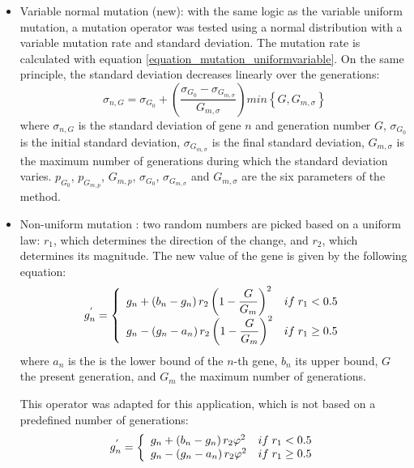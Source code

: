 \documentclass[twocol]{ametsoc}
\begin{document}
\begin{itemize}
	\item Variable normal mutation (new): with the same logic as the variable uniform mutation, a mutation operator was tested using a normal distribution with a variable mutation rate and standard deviation. The mutation rate is calculated with equation \ref{equation_mutation_uniformvariable}. On the same principle, the standard deviation decreases linearly over the generations:
	\begin{equation}
	\sigma_{n,G} = \sigma_{G_{0}}+\left( \dfrac{\sigma_{G_{0}}-\sigma_{G_{m,\sigma}}}{G_{m,\sigma}} \right) min\left\lbrace G,G_{m,\sigma}\right\rbrace 
	\label{equation_mutation_normalvariable}
	\end{equation}
	where $\sigma_{n,G}$ is the standard deviation of gene $n$ and generation number $G$, $\sigma_{G_{0}}$ is the initial standard deviation, $\sigma_{G_{m,\sigma}}$ is the final standard deviation, $G_{m,\sigma}$ is the maximum number of generations during which the standard deviation varies. $p_{G_{0}}$, $p_{G_{m,p}}$, $G_{m,p}$, $\sigma_{G_{0}}$, $\sigma_{G_{m,\sigma}}$ and $G_{m,\sigma}$ are the six parameters of the method.
	
	\item Non-uniform mutation \citep{Michalewicz1996}: two random numbers are picked based on a uniform law: $r_{1}$, which determines the direction of the change, and $r_{2}$, which determines its magnitude. The new value of the gene is given by the following equation:
	\begin{equation}
	g_{n}^{'} = 
	\left\lbrace \begin{array}{l l} 
	g_{n} + \left(b_{n}-g_{n}\right) r_{2} \left(1 - \dfrac{G}{G_{m}} \right)^{2} & if \; r_{1} < 0.5 \\
	g_{n} - \left(g_{n}-a_{n}\right) r_{2} \left(1 - \dfrac{G}{G_{m}} \right)^{2} & if \; r_{1} \geq 0.5 \\
	\end{array} \right.
	\label{equation_mutation_nonuniform_original}
	\end{equation}
	where $a_{n}$ is the is the lower bound of the $n$-th gene, $b_{n}$ its upper bound, $G$ the present generation, and $G_{m}$ the maximum number of generations.
	
	This operator was adapted for this application, which is not based on a predefined number of generations:
	\begin{equation}
	g_{n}^{'} = 
	\left\lbrace \begin{array}{l l} 
	g_{n} + \left(b_{n}-g_{n}\right) r_{2} \varphi^{2} & if \; r_{1} < 0.5 \\
	g_{n} - \left(g_{n}-a_{n}\right) r_{2} \varphi^{2} & if \; r_{1} \geq 0.5 \\
	\end{array} \right.
	\label{equation_mutation_nonuniform}
	\end{equation}
	

\end{itemize}
\end{document}
